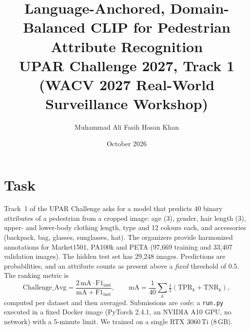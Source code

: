 \documentclass[10pt,a4paper]{article}
\title{\vspace{-1.2cm}\textbf{Language-Anchored, Domain-Balanced CLIP for Pedestrian Attribute Recognition}\\[2pt]
\large UPAR Challenge 2027, Track 1 (WACV 2027 Real-World Surveillance Workshop)}
\author{Muhammad Ali \quad Fasih Hasan Khan}
\date{October 2026}
\begin{document}
\maketitle
\vspace{-0.8cm}

\section{Task}
Track~1 of the UPAR Challenge asks for a model that predicts 40 binary attributes of a pedestrian from a cropped
image: age (3), gender, hair length (3), upper- and lower-body clothing length, type and 12 colours each,
and accessories (backpack, bag, glasses, sunglasses, hat). The organizers provide harmonized annotations for
Market1501, PA100k and PETA (97,669 training and 33,407 validation images). The hidden test set has 29,248 images.
Predictions are probabilities, and an attribute counts as present above a \emph{fixed} threshold of 0.5.
The ranking metric is
\[
\text{Challenge\_Avg} = \frac{2\,\text{mA}\cdot\text{F1}_\text{inst}}{\text{mA}+\text{F1}_\text{inst}},\qquad
\text{mA} = \frac{1}{40}\sum_k \tfrac{1}{2}\left(\text{TPR}_k+\text{TNR}_k\right),
\]
computed per dataset and then averaged. Submissions are \emph{code}: a \texttt{run.py} executed in a fixed Docker
image (PyTorch 2.4.1, an NVIDIA A10 GPU, no network) with a 5-minute limit. We trained on a single RTX 3060\,Ti (8\,GB).
\end{document}
